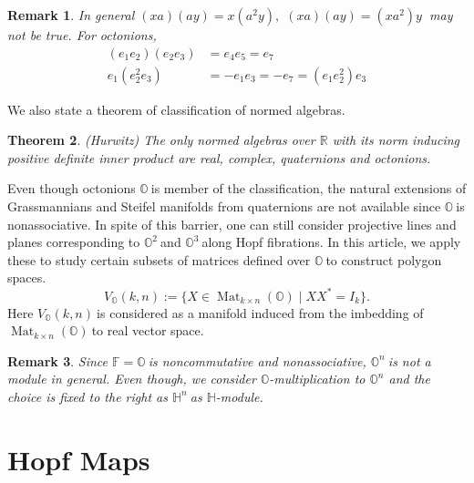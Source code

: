 \documentclass[a4paper]{article}%
\newtheorem{theorem}{Theorem}
\newtheorem{remark}[theorem]{Remark}
\begin{document}
\bigskip

\begin{remark}
\label{MoufangRmk}In general $\left(  xa\right)  \left(  ay\right)  =x\left(
a^{2}y\right)  ,$ $\left(  xa\right)  \left(  ay\right)  =\left(
xa^{2}\right)  y$ $\ $may not be true. For octonions,%
\begin{align*}
\left(  e_{1}e_{2}\right)  \left(  e_{2}e_{3}\right)   &  =e_{4}e_{5}=e_{7}\\
e_{1}\left(  e_{2}^{2}e_{3}\right)   &  =-e_{1}e_{3}=-e_{7}=\left(  e_{1}%
e_{2}^{2}\right)  e_{3}%
\end{align*}

\end{remark}

We also state a theorem of classification of normed algebras.

\begin{theorem}
(Hurwitz) The only normed algebras over $\mathbb{R}$ with its norm inducing
positive definite inner product are real, complex, quaternions and octonions.
\end{theorem}

Even though octonions $\mathbb{O\ }$is member of the classification, the
natural extensions of Grassmannians and Steifel manifolds from quaternions are
not available since $\mathbb{O\ }$is nonassociative. In spite of this barrier,
one can still consider projective lines and planes corresponding to
$\mathbb{O}^{2}\ $and $\mathbb{O}^{3}\ $along Hopf fibrations. In this
article, we apply these to study certain subsets of matrices defined over
$\mathbb{O\ }$to construct polygon spaces.
\[
V_{\mathbb{O}}(k,n):=\{X\in\operatorname{Mat}_{k\times n}(\mathbb{O})\mid
XX^{\ast}=I_{k}\}.
\]
Here $V_{\mathbb{O}}(k,n)\ $is considered as a manifold induced from the
imbedding of $\operatorname{Mat}_{k\times n}(\mathbb{O})\ $to real vector space.

\begin{remark}
Since $\mathbb{F}=\mathbb{O\ }$is noncommutative and nonassociative,
$\mathbb{O}^{n}\ $is not a module in general. Even though, we consider
$\mathbb{O}$-multiplication to $\mathbb{O}^{n}$ and the choice is fixed to the
right as $\mathbb{H}^{n}\ $as $\mathbb{H}$-module.
\end{remark}

\section{Hopf Maps}
\end{document}
